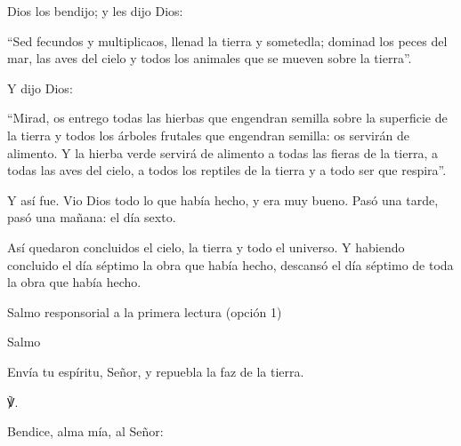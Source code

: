			\begin{readbody}Dios los bendijo; y les dijo Dios: \end{readbody}
			
			\begin{readtalk}“Sed fecundos y multiplicaos, llenad la tierra y sometedla; dominad los peces del mar, las aves del cielo y todos los animales que se mueven sobre la tierra”. \end{readtalk}
			
			\begin{readbody}Y dijo Dios: \end{readbody}
			
			\begin{readtalk}“Mirad, os entrego todas las hierbas que engendran semilla sobre la superficie de la tierra y todos los árboles frutales que engendran semilla: os servirán de alimento. Y la hierba verde servirá de alimento a todas las fieras de la tierra, a todas las aves del cielo, a todos los reptiles de la tierra y a todo ser que respira”. \end{readtalk}
			
			\begin{readbody}Y así fue. Vio Dios todo lo que había hecho, y era muy bueno. Pasó una tarde, pasó una mañana: el día sexto. \end{readbody}
			
			\begin{readbody}Así quedaron concluidos el cielo, la tierra y todo el universo. Y habiendo concluido el día séptimo la obra que había hecho, descansó el día séptimo de toda la obra que había hecho.\end{readbody}
			
			\begin{readtitle}Salmo responsorial a la primera lectura (opción 1)\end{readtitle}
			
			\begin{readbook}Salmo \end{readbook}
			
			\begin{readtheme}Envía tu espíritu, Señor, y repuebla la faz de la tierra.\end{readtheme}
			
			\begin{readbody}\begin{readred}℣.\end{readred} Bendice, alma mía, al Señor: \end{readbody}
			
